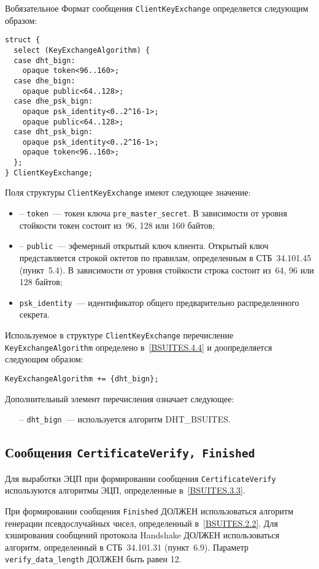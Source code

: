 \begin{appendix}{В}{обязательное}
Формат сообщения \lstinline{ClientKeyExchange} определяется следующим образом:
\begin{lstlisting}
struct {
  select (KeyExchangeAlgorithm) {
  case dht_bign:
    opaque token<96..160>;
  case dhe_bign:
    opaque public<64..128>;
  case dhe_psk_bign:
    opaque psk_identity<0..2^16-1>;
    opaque public<64..128>;
  case dht_psk_bign:
    opaque psk_identity<0..2^16-1>;
	opaque token<96..160>;
  };
} ClientKeyExchange;
\end{lstlisting}

Поля структуры \lstinline{ClientKeyExchange} имеют следующее значение:
\begin{itemize}
\item [--]
\lstinline{token}~--- токен ключа \lstinline{pre_master_secret}. 
В зависимости от уровня стойкости токен состоит из~96, 128 или 160 байтов; 

\item[--]
\lstinline{public}~--- эфемерный открытый ключ клиента. Открытый 
ключ представляется строкой октетов по правилам, определенным в СТБ~34.101.45 
(пункт~5.4). В зависимости от уровня стойкости строка состоит из~64, 96 
или 128 байтов;  

\item[--]
\lstinline{psk_identity}~--- идентификатор общего предварительно 
распределенного секрета. 
\end{itemize}

Используемое в структуре \lstinline{ClientKeyExchange} перечисление 
\lstinline{KeyExchangeAlgorithm} определено в~\ref{BSUITES.4.4} и доопределяется 
следующим образом: 
\begin{lstlisting}
KeyExchangeAlgorithm += {dht_bign};
\end{lstlisting}

Дополнительный элемент перечисления означает следующее:
\begin{itemize}
\item[--]
\lstinline{dht_bign}~--- используется алгоритм DHT\_BSUITES.
\end{itemize}

\subsection{Сообщения \lstinline{CertificateVerify, Finished}}\label{BSUITES.4.9}

Для выработки ЭЦП при формировании сообщения \lstinline{CertificateVerify} 
используются алгоритмы ЭЦП, определенные в~\ref{BSUITES.3.3}.  

При формировании сообщения \lstinline{Finished} ДОЛЖЕН использоваться алгоритм 
генерации псевдослучайных чисел, определенный в~\ref{BSUITES.2.2}. Для хэширования 
сообщений протокола Handshake ДОЛЖЕН использоваться алгоритм, 
определенный в СТБ~34.101.31 (пункт~6.9). Параметр 
\lstinline{verify_data_length} ДОЛЖЕН быть равен 12. 

\end{appendix}
\mbox{}
\vfill
\mbox{}
\clearpage
